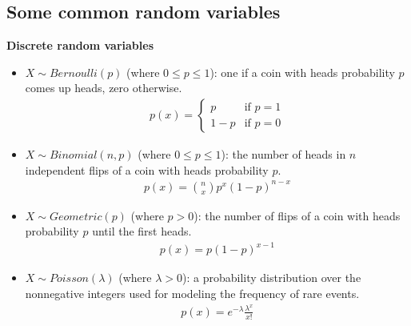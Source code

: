 \documentclass{article}
\begin{document}
\subsection{Some common random variables}

\textbf{Discrete random variables}
\begin{itemize}
\item $X \sim Bernoulli(p)$ (where $0 \le p \le 1$): one if a coin with heads probability $p$ comes up heads, zero otherwise.
  \begin{eqnarray*}
    p(x) = \begin{cases}
      p & \text{if $p = 1$} \\
      1-p & \text{if $p = 0$}
    \end{cases}
  \end{eqnarray*}
\item $X \sim Binomial(n, p)$ (where $0 \le p \le 1$): the number of heads in $n$ independent flips of a coin with heads probability $p$.
  \begin{eqnarray*}
    p(x) = {n \choose x} p^x(1-p)^{n-x}
  \end{eqnarray*}
\item $X \sim Geometric(p)$ (where $p > 0$): the number of flips of a coin with heads probability $p$ until the first heads.
  \begin{eqnarray*}
    p(x) = p(1 - p)^{x-1}
  \end{eqnarray*}
\item $X \sim Poisson(\lambda)$ (where $\lambda > 0$): a probability distribution over the nonnegative integers used for modeling the
  frequency of rare events.
  \begin{eqnarray*}
    p(x) = e^{-\lambda} \frac{\lambda^x}{x!}
  \end{eqnarray*}
\end{itemize}
\end{document}
